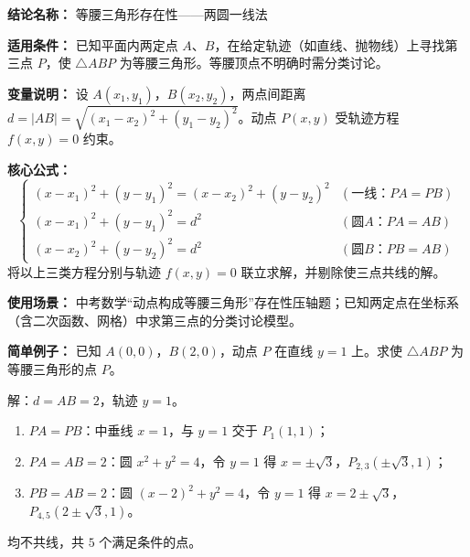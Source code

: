 \textbf{结论名称：} 等腰三角形存在性——两圆一线法

\textbf{适用条件：} 已知平面内两定点 $A$、$B$，在给定轨迹（如直线、抛物线）上寻找第三点 $P$，使 $\triangle ABP$ 为等腰三角形。等腰顶点不明确时需分类讨论。

\textbf{变量说明：} 设 $A(x_1,y_1)$，$B(x_2,y_2)$，两点间距离 $d=|AB|=\sqrt{(x_1-x_2)^2+(y_1-y_2)^2}$。动点 $P(x,y)$ 受轨迹方程 $f(x,y)=0$ 约束。

\textbf{核心公式：}
\[
\boxed{
\begin{cases}
(x-x_1)^2+(y-y_1)^2 = (x-x_2)^2+(y-y_2)^2 & (\text{一线：}PA=PB)\\[4pt]
(x-x_1)^2+(y-y_1)^2 = d^2 & (\text{圆}A\text{：}PA=AB)\\[4pt]
(x-x_2)^2+(y-y_2)^2 = d^2 & (\text{圆}B\text{：}PB=AB)
\end{cases}
}
\]
将以上三类方程分别与轨迹 $f(x,y)=0$ 联立求解，并剔除使三点共线的解。

\textbf{使用场景：} 中考数学“动点构成等腰三角形”存在性压轴题；已知两定点在坐标系（含二次函数、网格）中求第三点的分类讨论模型。

\textbf{简单例子：} 
已知 $A(0,0)$，$B(2,0)$，动点 $P$ 在直线 $y=1$ 上。求使 $\triangle ABP$ 为等腰三角形的点 $P$。

解：$d=AB=2$，轨迹 $y=1$。
\begin{enumerate}
    \item $PA=PB$：中垂线 $x=1$，与 $y=1$ 交于 $P_1(1,1)$；
    \item $PA=AB=2$：圆 $x^2+y^2=4$，令 $y=1$ 得 $x=\pm\sqrt{3}$，$P_{2,3}(\pm\sqrt{3},1)$；
    \item $PB=AB=2$：圆 $(x-2)^2+y^2=4$，令 $y=1$ 得 $x=2\pm\sqrt{3}$，$P_{4,5}(2\pm\sqrt{3},1)$。
\end{enumerate}
均不共线，共 $5$ 个满足条件的点。
